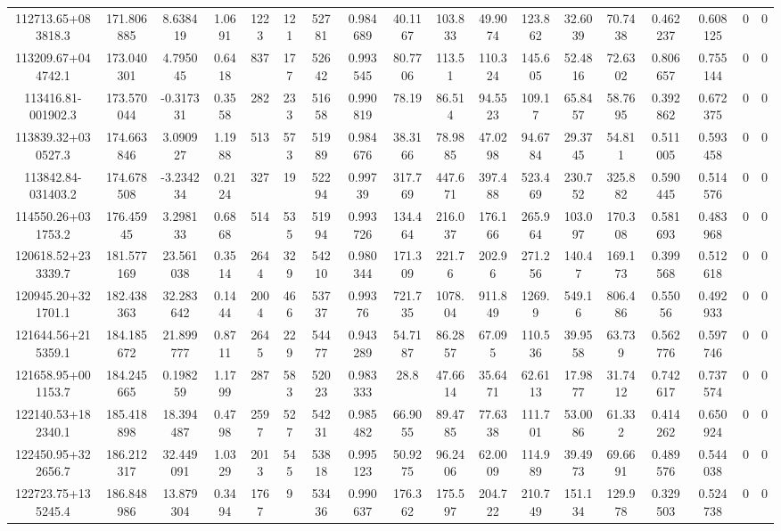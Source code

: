 \begin{table}
\begin{tabular}{cccccccccccccccccc}
112713.65+083818.3 & 171.806885 & 8.638419 & 1.0691 & 1223 & 121 & 52781 & 0.984689 & 40.1167 & 103.833 & 49.9074 & 123.862 & 32.6039 & 70.7438 & 0.462237 & 0.608125 & 0 & 0 \\
113209.67+044742.1 & 173.040301 & 4.795045 & 0.6418 & 837 & 177 & 52642 & 0.993545 & 80.7706 & 113.51 & 110.324 & 145.605 & 52.4816 & 72.6302 & 0.806657 & 0.755144 & 0 & 0 \\
113416.81-001902.3 & 173.570044 & -0.317331 & 0.3558 & 282 & 233 & 51658 & 0.990819 & 78.19 & 86.514 & 94.5523 & 109.17 & 65.8457 & 58.7695 & 0.392862 & 0.672375 & 0 & 0 \\
113839.32+030527.3 & 174.663846 & 3.090927 & 1.1988 & 513 & 573 & 51989 & 0.984676 & 38.3166 & 78.9885 & 47.0298 & 94.6784 & 29.3745 & 54.811 & 0.511005 & 0.593458 & 0 & 0 \\
113842.84-031403.2 & 174.678508 & -3.234234 & 0.2124 & 327 & 19 & 52294 & 0.99739 & 317.769 & 447.671 & 397.488 & 523.469 & 230.752 & 325.882 & 0.590445 & 0.514576 & 0 & 0 \\
114550.26+031753.2 & 176.45945 & 3.298133 & 0.6868 & 514 & 535 & 51994 & 0.993726 & 134.464 & 216.037 & 176.166 & 265.964 & 103.097 & 170.308 & 0.581693 & 0.483968 & 0 & 0 \\
120618.52+233339.7 & 181.577169 & 23.561038 & 0.3514 & 2644 & 329 & 54210 & 0.980344 & 171.309 & 221.76 & 202.96 & 271.256 & 140.47 & 169.173 & 0.399568 & 0.512618 & 0 & 0 \\
120945.20+321701.1 & 182.438363 & 32.283642 & 0.1444 & 2004 & 466 & 53737 & 0.99376 & 721.735 & 1078.04 & 911.849 & 1269.9 & 549.16 & 806.486 & 0.55056 & 0.492933 & 0 & 0 \\
121644.56+215359.1 & 184.185672 & 21.899777 & 0.8711 & 2645 & 229 & 54477 & 0.943289 & 54.7187 & 86.2857 & 67.095 & 110.536 & 39.9558 & 63.739 & 0.562776 & 0.597746 & 0 & 0 \\
121658.95+001153.7 & 184.245665 & 0.198259 & 1.1799 & 287 & 583 & 52023 & 0.983333 & 28.8 & 47.6614 & 35.6471 & 62.6113 & 17.9877 & 31.7412 & 0.742617 & 0.737574 & 0 & 0 \\
122140.53+182340.1 & 185.418898 & 18.394487 & 0.4798 & 2597 & 527 & 54231 & 0.985482 & 66.9055 & 89.4785 & 77.6338 & 111.701 & 53.0086 & 61.332 & 0.414262 & 0.650924 & 0 & 0 \\
122450.95+322656.7 & 186.212317 & 32.449091 & 1.0329 & 2013 & 545 & 53818 & 0.995123 & 50.9275 & 96.2406 & 62.0009 & 114.989 & 39.4973 & 69.6691 & 0.489576 & 0.544038 & 0 & 0 \\
122723.75+135245.4 & 186.848986 & 13.879304 & 0.3494 & 1767 & 9 & 53436 & 0.990637 & 176.362 & 175.597 & 204.722 & 210.749 & 151.134 & 129.978 & 0.329503 & 0.524738 & 0 & 0 \\

\end{tabular}
\end{table}

